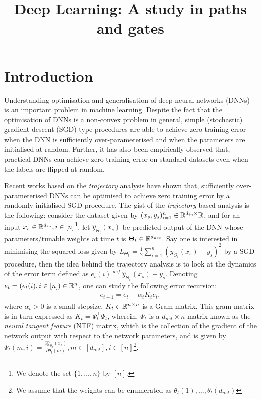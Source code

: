 \documentclass{article}
\title{Deep Learning: A study in paths and gates}
\begin{document}
\maketitle
\section{Introduction}
Understanding optimisation and generalisation of deep neural networks (DNNs) is an important problem in machine learning. Despite the fact that the optimisation of DNNs is a non-convex problem in general, simple (stochastic) gradient descent (SGD) type procedures are able to achieve zero training error when the DNN is sufficiently over-parameterised and when the parameters are initialised at random. Further, it has also been empirically observed that, practical DNNs can achieve zero training error on standard datasets even when the labels are flipped at random. 

Recent works based on the \emph{trajectory} analysis \cite{} have shown that, sufficiently over-parameterised DNNs can be optimised to achieve zero training error by a randomly initialised SGD procedure. The gist of the \emph{trajectory} based analysis is the following: consider the dataset given by $(x_s,y_s)_{i=1}^n\in \mathbb{R}^{d_{in}\times} \mathbb{R}$, and for an input $x_s\in \mathbb{R}^{d_{in}},i\in[n]$\footnote{We denote the set $\{1,\ldots, n\}$ by $[n]$.}, let $\hat{y}_{\Theta_t}(x_s)$ be predicted output of the DNN whose parameters/tunable weights at time $t$ is $\Theta_t\in \mathbb{R}^{d_{net}}$. Say one is interested in minimising the squared loss given by $L_{\Theta_t}=\frac{1}{2}\sum_{i=1}^n\left(\hat{y}_{\Theta_t}(x_s)-y_s\right)^2$ by a SGD procedure, then the idea behind the trajectory analysis is to look at the dynamics of the error term defined as $e_t(i)\stackrel{def}{=}\hat{y}_{\Theta_t}(x_s) -y_s$. Denoting $e_t=(e_t(i),i\in[n])\in \mathbb{R}^n$, one can study the following error recursion:
\begin{align}\label{eq:trajecbasic}
e_{t+1}=e_t-\alpha_t K_t e_t,
\end{align}
where $\alpha_t>0$ is a small stepsize, $K_t\in \mathbb{R}^{n\times n}$ is a Gram matrix. This gram matrix is in turn expressed as $K_t=\Psi_t^\top \Psi_t$, wherein, $\Psi_t$ is a $d_{net}\times n$ matrix known as the \emph{neural tangent feature} (NTF) matrix, which is the collection of the gradient of the network output with respect to the network parameters, and is given by $\Psi_t(m,i)=\frac{\partial \hat{y}_{\Theta_t}(x_s)}{\partial \theta_t(m)},m\in[d_{net}], i\in[n]$\footnote{We assume that the weights can be enumerated as $\theta_t(1),\ldots,\theta_t(d_{net})$}.
\end{document}
